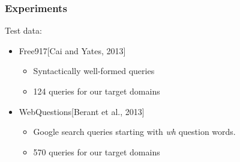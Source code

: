 \documentclass[mathserif,12pt]{beamer}
\newcommand{\hlight}[1]{{\color{blue!80} #1}}
\newcommand \free{Free917\xspace}
\newcommand \webq{WebQuestions\xspace}
\begin{document}
\begin{frame}[noframenumbering]
\frametitle{Experiments}

  \hlight{Test data:} 
  \begin{itemize}
  	\item \free [Cai and Yates, 2013] 
  	\begin{itemize}
  	 \item Syntactically well-formed queries
  	 \item 124 queries for our target domains
  	\end{itemize}

  	\item \webq [Berant et al., 2013] 
  	\begin{itemize}
	  \item Google search queries starting with \textit{wh} question words.
	  \item 570 queries for our target domains
	\end{itemize}
  \end{itemize}
\end{frame}
\end{document}
